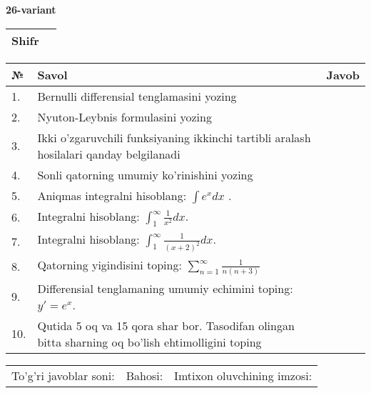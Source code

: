 \documentclass{article}
\begin{document}
  \egroup
  
  \newpage
  
  
  \textbf{26-variant}\\
  
  \bgroup
  \def\arraystretch{1.6} %
  
  \begin{tabular}{|m{5.7cm}|m{9.5cm}|}
  \hline
  Shifr & \\
  \hline
  \end{tabular}
  
  \vspace{1cm}
  
  \begin{tabular}{|m{0.7cm}|m{10cm}|m{4cm}|}
  \hline
  № & Savol & Javob \\
  \hline
  1. & Bernulli differensial tenglamasini yozing &  \\
  \hline
  2. & Nyuton-Leybnis formulasini yozing &  \\
  \hline
  3. & Ikki o'zgaruvchili funksiyaning ikkinchi tartibli aralash hosilalari qanday belgilanadi &  \\
  \hline
  4. & Sonli qatorning umumiy ko'rinishini yozing &  \\
  \hline
  5. & Aniqmas integralni hisoblang: \(\int {e^{x}dx}\) . &  \\
  \hline
  6. & Integralni hisoblang: \(\int_{1}^{\infty}{\frac{1}{x^{2}}dx}\). &  \\
  \hline
  7. & Integralni hisoblang: \(\int_{1}^{\infty}{\frac{1}{(x + 2)^{2}}dx}\). &  \\
  \hline
  8. & Qatorning yigindisini toping: \(\sum_{n = 1}^{\infty}\frac{1}{n(n + 3)}\) &  \\
  \hline
  9. & Differensial tenglamaning umumiy echimini toping: \(y' = e^{x}\). &  \\
  \hline
  10. & Qutida 5 oq va 15 qora shar bor. Tasodifan olingan bitta sharning oq bo'lish ehtimolligini toping &  \\
  \hline
  \end{tabular}
  
  \vspace{1cm}
  
  \begin{tabular}{lll}
  To'g'ri javoblar soni: \underline{\hspace{1.5cm}} & 
  Bahosi: \underline{\hspace{1.5cm}} & 
  Imtixon oluvchining imzosi: \underline{\hspace{2cm}} \\
  \end{tabular}
  
\end{document}
